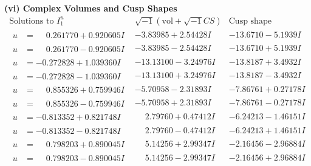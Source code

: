 \documentclass[1p]{elsarticle_modified}
\theoremstyle{definition}
\newcommand{\I}{\sqrt{-1}}
\begin{document}
\newpage\flushleft \textbf{(vi) Complex Volumes and Cusp Shapes}
$$\begin{array}{c|c|c}  
\text{Solutions to }I^u_{1}& \I (\text{vol} + \sqrt{-1}CS) & \text{Cusp shape}\\
 \hline 
\begin{aligned}
u &= \phantom{-}0.261770 + 0.920605 I\end{aligned}
 & -3.83985 + 2.54428 I & -13.6710 - 5.1939 I \\ \hline\begin{aligned}
u &= \phantom{-}0.261770 - 0.920605 I\end{aligned}
 & -3.83985 - 2.54428 I & -13.6710 + 5.1939 I \\ \hline\begin{aligned}
u &= -0.272828 + 1.039360 I\end{aligned}
 & -13.13100 - 3.24976 I & -13.8187 + 3.4932 I \\ \hline\begin{aligned}
u &= -0.272828 - 1.039360 I\end{aligned}
 & -13.13100 + 3.24976 I & -13.8187 - 3.4932 I \\ \hline\begin{aligned}
u &= \phantom{-}0.855326 + 0.759946 I\end{aligned}
 & -5.70958 - 2.31893 I & -7.86761 + 0.27178 I \\ \hline\begin{aligned}
u &= \phantom{-}0.855326 - 0.759946 I\end{aligned}
 & -5.70958 + 2.31893 I & -7.86761 - 0.27178 I \\ \hline\begin{aligned}
u &= -0.813352 + 0.821748 I\end{aligned}
 & \phantom{-}2.79760 + 0.47412 I & -6.24213 - 1.46151 I \\ \hline\begin{aligned}
u &= -0.813352 - 0.821748 I\end{aligned}
 & \phantom{-}2.79760 - 0.47412 I & -6.24213 + 1.46151 I \\ \hline\begin{aligned}
u &= \phantom{-}0.798203 + 0.890045 I\end{aligned}
 & \phantom{-}5.14256 + 2.99347 I & -2.16456 - 2.96884 I \\ \hline\begin{aligned}
u &= \phantom{-}0.798203 - 0.890045 I\end{aligned}
 & \phantom{-}5.14256 - 2.99347 I & -2.16456 + 2.96884 I \\ \hline\begin{aligned}

\end{aligned}
\end{array}$$
\end{document}
